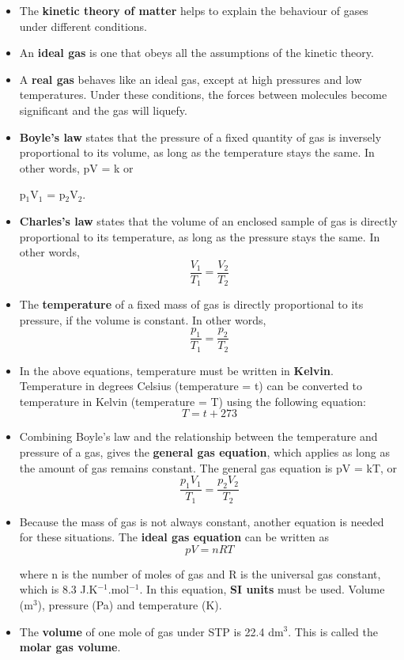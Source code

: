 \begin{itemize}
\item{The \textbf{kinetic theory of matter} helps to explain the behaviour of gases under different conditions.}
\item{An \textbf{ideal gas} is one that obeys all the assumptions of the kinetic theory.}
\item{A \textbf{real gas} behaves like an ideal gas, except at high pressures and low temperatures. Under these conditions, the forces between molecules become significant and the gas will liquefy.}
\item{\textbf{Boyle's law} states that the pressure of a fixed quantity of gas is inversely proportional to its volume, as long as the temperature stays the same. In other words, pV = k or
\begin{center}
p$_{1}$V$_{1}$ = p$_{2}$V$_{2}$.
\end{center}}
\item{\textbf{Charles's law} states that the volume of an enclosed sample of gas is directly proportional to its temperature, as long as the pressure stays the same. In other words, \begin{equation*}\frac{V_{1}}{T_{1}} = \frac{V_{2}}{T_{2}} \end{equation*} }
\item{The \textbf{temperature} of a fixed mass of gas is directly proportional to its pressure, if the volume is constant. In other words, \begin{equation*}\frac{p_{1}}{T_{1}} = \frac{p_{2}}{T_{2}} \end{equation*} }
\item{In the above equations, temperature must be written in \textbf{Kelvin}. Temperature in degrees Celsius (temperature = t) can be converted to temperature in Kelvin (temperature = T) using the following equation:
\begin{equation*}
T = t + 273
\end{equation*}}
\item{Combining Boyle's law and the relationship between the temperature and pressure of a gas, gives the \textbf{general gas equation}, which applies as long as the amount of gas remains constant. The general gas equation is pV = kT, or
\begin{equation*}
\frac{p_{1}V_{1}}{T_{1}} = \frac{p_{2}V_{2}}{T_{2}}
\end{equation*}}
\item{Because the mass of gas is not always constant, another equation is needed for these situations. The \textbf{ideal gas equation} can be written as
\begin{equation*}
pV = nRT
\end{equation*}

where n is the number of moles of gas and R is the universal gas constant, which is 8.3 J.K$^{-1}$.mol$^{-1}$. In this equation, \textbf{SI units} must be used. Volume (m$^{3}$), pressure (Pa) and temperature (K).}
\item{The \textbf{volume} of one mole of gas under STP is 22.4 dm$^{3}$. This is called the \textbf{molar gas volume}.}

\end{itemize}

